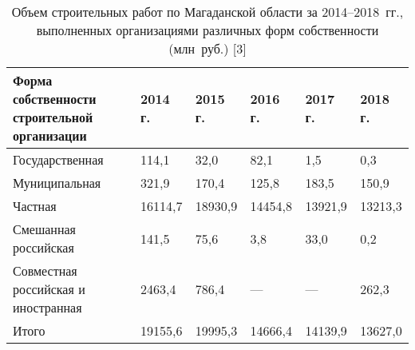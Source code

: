 \begin{table}[h!]
\caption{Объем строительных работ по Магаданской области за 2014--2018~гг., выполненных организациями различных форм собственности (млн~руб.) [3]}
\label{tab:serebryakova-tab-1}
\begin{changemargin}{-2cm}{0cm}
\begin{tabular}{llllll}
\toprule
Форма 			собственности \newline строительной организации & 2014 			г. & 2015 			г. & 2016 			г. & 2017 			г. & 2018 			г. \\
\midrule
Государственная                                 & 114,1      & 32,0       & 82,1       & 1,5        & 0,3        \\
Муниципальная                                   & 321,9      & 170,4      & 125,8      & 183,5      & 150,9      \\
Частная                                         & 16114,7    & 18930,9    & 14454,8    & 13921,9    & 13213,3    \\
Смешанная 			российская                         & 141,5      & 75,6       & 3,8        & 33,0       & 0,2        \\
Совместная 			российская и иностранная          & 2463,4     & 786,4      & ---          & ---          & 262,3      \\
Итого                                           & 19155,6    & 19995,3    & 14666,4    & 14139,9    & 13627,0 \\
\bottomrule
\end{tabular}
\end{changemargin}
\end{table}
